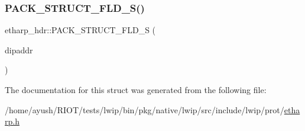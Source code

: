 \mbox{\label{structetharp__hdr_a9014d4d9dd83d01fc9f7af9ed67bfa38}} 
\subsubsection{\texorpdfstring{P\+A\+C\+K\+\_\+\+S\+T\+R\+U\+C\+T\+\_\+\+F\+L\+D\+\_\+\+S()}{PACK\_STRUCT\_FLD\_S()}\hspace{0.1cm}{\footnotesize\ttfamily [8/8]}}
{\footnotesize\ttfamily etharp\+\_\+hdr\+::\+P\+A\+C\+K\+\_\+\+S\+T\+R\+U\+C\+T\+\_\+\+F\+L\+D\+\_\+S (\begin{DoxyParamCaption}\item[{struct ip4\+\_\+addr2}]{dipaddr }\end{DoxyParamCaption})}



The documentation for this struct was generated from the following file\+:\begin{DoxyCompactItemize}
\item 
/home/ayush/\+R\+I\+O\+T/tests/lwip/bin/pkg/native/lwip/src/include/lwip/prot/\hyperlink{native_2lwip_2src_2include_2lwip_2prot_2etharp_8h}{etharp.\+h}\end{DoxyCompactItemize}
